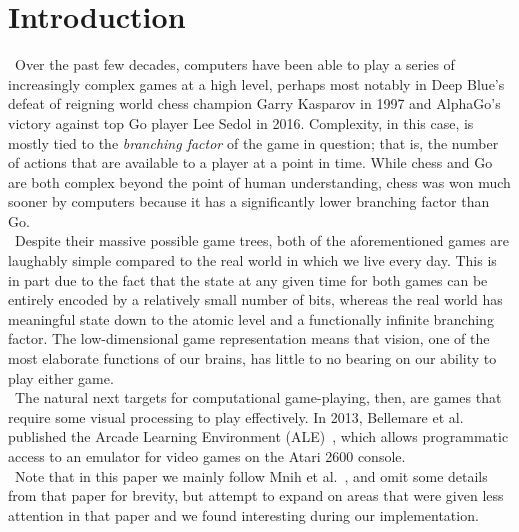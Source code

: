 \documentclass[conference]{IEEEtran}
\begin{document}
\section{Introduction}
\noindent\ Over the past few decades, computers have been able to play a
series of increasingly complex games at a high level, perhaps most notably
in Deep Blue's defeat of reigning world chess champion Garry Kasparov in 1997
and AlphaGo's victory against top Go player Lee Sedol in 2016. Complexity, in
this case, is mostly tied to the \emph{branching factor} of the game in question;
that is, the number of actions that are available to a player at a point in time.
While chess and Go are both complex beyond the point of human understanding,
chess was won much sooner by computers because it has a significantly lower branching
factor than Go.\\
\indent\ Despite their massive possible game trees, both of the aforementioned games
are laughably simple compared to the real world in which we live every day. This is
in part due to the fact that the state at any given time for both games can be entirely
encoded by a relatively small number of bits, whereas the real world has meaningful
state down to the atomic level and a functionally infinite branching factor.
The low-dimensional game representation means that vision, one of the most
elaborate functions of our brains, has little to no bearing on our ability to play
either game.\\
\indent\ The natural next targets for computational game-playing, then, are games
that require some visual processing to play effectively. In 2013, Bellemare et al.
published the Arcade Learning Environment (ALE)~\cite{bellemare13arcade}, which allows
programmatic access to an emulator for video games on the Atari 2600 console.\\
\indent\ Note that in this paper we mainly follow Mnih et al.~\cite{mnih2013playing},
and omit some details from that paper for brevity, but attempt to expand on areas that were
given less attention in that paper and we found interesting during our implementation.
\end{document}
